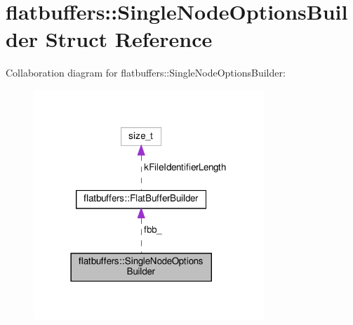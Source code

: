 \hypertarget{structflatbuffers_1_1SingleNodeOptionsBuilder}{}\section{flatbuffers\+:\+:Single\+Node\+Options\+Builder Struct Reference}
\label{structflatbuffers_1_1SingleNodeOptionsBuilder}


Collaboration diagram for flatbuffers\+:\+:Single\+Node\+Options\+Builder\+:
\nopagebreak
\begin{figure}[H]
\begin{center}
\leavevmode
\includegraphics[width=246pt]{structflatbuffers_1_1SingleNodeOptionsBuilder__coll__graph}
\end{center}
\end{figure}
